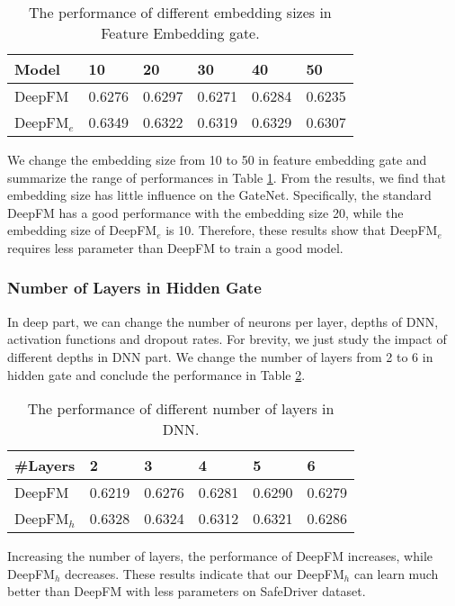 \documentclass[sigconf,nonacm=true]{acmart}
\begin{document}
\begin{table}[!ht]
\centering
\caption{The performance of different embedding sizes in Feature Embedding gate.}
\label{table:t7}
\begin{tabular}{llllll}
Model & 10 & 20 & 30 & 40 & 50 \\ \hline
DeepFM & 0.6276 & 0.6297 & 0.6271 & 0.6284 & 0.6235 \\
DeepFM$_e$ & 0.6349 & 0.6322 & 0.6319 & 0.6329 & 0.6307 \tabularnewline
\bottomrule
\end{tabular}
\end{table}
  

We change the embedding size from 10 to 50 in feature embedding gate and summarize the range of performances in Table \ref{table:t7}. From the results, we find that embedding size has little influence on the GateNet.
Specifically, the standard DeepFM has a good performance with the embedding size 20, while the embedding size of DeepFM$_e$ is 10.
Therefore, these results show that DeepFM$_e$ requires less parameter than DeepFM to train a good model.


\subsubsection{Number of Layers in Hidden Gate}

In deep part, we can change the number of neurons per layer, depths of DNN, activation functions and dropout rates.
For brevity, we just study the impact of different depths in DNN part.
We change the number of layers from 2 to 6 in hidden gate and conclude the performance in Table \ref{table:t8}.


\begin{table}[!ht]
\centering
\caption{The performance of different number of layers in DNN.}
\label{table:t8}
\begin{tabular}{llllll}
\#Layers & 2 & 3 & 4 & 5 & 6 \\ \hline
DeepFM & 0.6219 & 0.6276 & 0.6281 & 0.6290 & 0.6279 \\
DeepFM$_h$ & 0.6328 & 0.6324 & 0.6312 & 0.6321 & 0.6286 \tabularnewline
\bottomrule
\end{tabular}
\end{table}


Increasing the number of layers, the performance of DeepFM increases, while DeepFM$_h$ decreases.
These results indicate that our DeepFM$_h$ can learn much better than DeepFM with less parameters on SafeDriver dataset.
\end{document}
